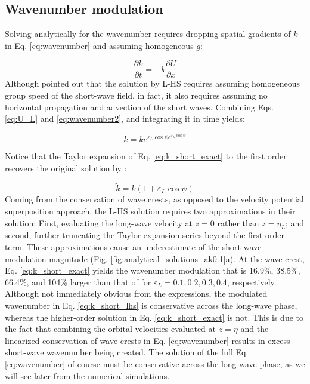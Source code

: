\documentclass[lineno]{jfm}
\begin{document}
\subsection{Wavenumber modulation}
\label{subsection:wavenumber_modulation}

Solving analytically for the wavenumber requires dropping spatial gradients of
$k$ in Eq. \ref{eq:wavenumber} and assuming homogeneous $g$:

\begin{equation}
\label{eq:wavenumber2}
\dfrac{\partial k}{\partial t}
= - k \dfrac{\partial U}{\partial x}
\end{equation}
Although \citet{peureux2021unsteady} pointed out that the solution by L-HS
requires assuming homogeneous group speed of the short-wave field, in fact,
it also requires assuming no horizontal propagation and advection of the short
waves.
Combining Eqs. \ref{eq:U_L} and \ref{eq:wavenumber2}, and integrating it in time
yields:

\begin{equation}
\label{eq:k_short_exact}
\widetilde{k} = k e^{\varepsilon_L \cos{\psi} e^{\varepsilon_L \cos{\psi}}}
\end{equation}

Notice that the Taylor expansion of Eq. \ref{eq:k_short_exact} to the first order
recovers the original solution by \citet{longuet1960changes}:

\begin{equation}
\label{eq:k_short_lhs}
\widetilde{k} = k (1 + \varepsilon_L \cos{\psi})
\end{equation}
Coming from the conservation of wave crests, as opposed to the velocity potential
superposition approach, the L-HS solution requires two approximations in their
solution:
First, evaluating the long-wave velocity at $z = 0$ rather than $z = \eta_L$; and
second, further truncating the Taylor expansion series beyond the first order term.
These approximations cause an underestimate of the short-wave modulation
magnitude (Fig. \ref{fig:analytical_solutions_ak0.1}a).
At the wave crest, Eq. \ref{eq:k_short_exact} yields the wavenumber modulation
that is 16.9\%, 38.5\%, 66.4\%, and 104\% larger than that of \citet{longuet1960changes}
for $\varepsilon_L = 0.1, 0.2, 0.3, 0.4$, respectively.
Although not immediately obvious from the expressions, the modulated wavenumber
in Eq. \ref{eq:k_short_lhs} is conservative across the long-wave phase, whereas
the higher-order solution in Eq. \ref{eq:k_short_exact} is not.
This is due to the fact that combining the orbital velocities evaluated at
$z=\eta$ and the linearized conservation of wave crests in Eq. \ref{eq:wavenumber}
results in excess short-wave wavenumber being created.
The solution of the full Eq. \ref{eq:wavenumber} of course must be conservative
across the long-wave phase, as we will see later from the numerical simulations.
\end{document}
